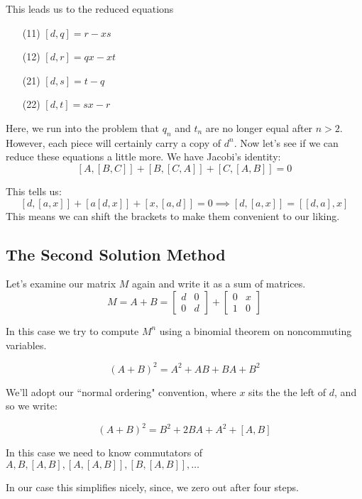 \documentclass{amsart}
\theoremstyle{definition}
\theoremstyle{remark}
\numberwithin{equation}{section}
\begin{document}
This leads us to the reduced equations\\



\begin{itemize}
\item[(11)] $[d,q] =  r -xs$\\
\item[(12)] $[d,r] = qx -xt$\\
\item[(21)] $[d,s] = t-q $\\
\item[(22)] $[d,t] = sx -r$
\end{itemize}


Here, we run into the problem that $q_n$ and $t_n$ are no longer equal after $n>2$.  However, each piece will certainly carry a copy of $d^n$.  Now let's see if we can reduce these equations a little more.  We have Jacobi's identity:
\[
[A,[B,C]] + [B,[C,A]] + [C,[A,B]] = 0
\]

This tells us:
\[
[d,[a,x]] + [a[d,x]]+[x,[a,d]] = 0 \implies [d,[a,x]] = [[d,a],x]
\]
This means we can shift the brackets to make them convenient to our liking.





\subsection{The Second Solution Method}


Let's examine our matrix $M$ again and write it as a sum of matrices.
\[
M = A + B = \begin{bmatrix}
d & 0\\
0 & d
\end{bmatrix} + 
\begin{bmatrix}
0 & x\\
1 & 0
\end{bmatrix}
\]

In this case we try to compute $M^n$ using a binomial theorem on noncommuting variables.

\[
(A+B)^2 = A^2 + AB + BA + B^2 
\]

We'll adopt our ``normal ordering" convention, where $x$ sits the the left of $d$, and so we write:

\[
(A+B)^2 = B^2 + 2BA + A^2 + [A,B]
\]

In this case we need to know commutators of $A,B,[A,B],[A,[A,B]],[B,[A,B]],\dots$


In our case this simplifies nicely, since, we zero out after four steps.
\end{document}
